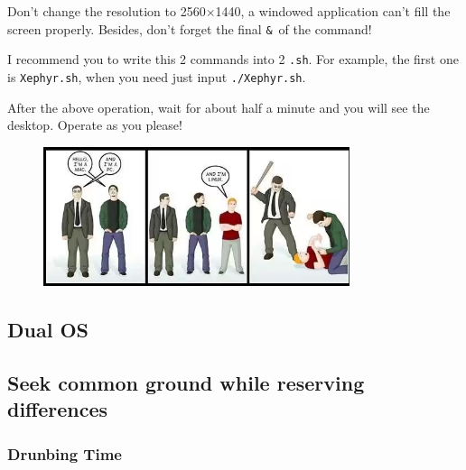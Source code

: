 \documentclass[12pt]{ctexart}
\newenvironment{mdquote}
{%
  \par\noindent
  \begin{list}{}{%
      \setlength{\leftmargin}{1em}%
      \setlength{\rightmargin}{0pt}%
      \setlength{\itemindent}{0pt}%
      \setlength{\listparindent}{\parindent}%
      \setlength{\topsep}{0.5\baselineskip}%
  }
  \item[\textbf{>}\ ]\itshape
}
{\end{list}\par}
\begin{document}
\begin{mdquote}
Don't change the resolution to 2560$\times$1440, a windowed
application can't fill the screen properly. Besides,
don't forget the final \texttt{\&}\ of the command!
\end{mdquote}

I recommend you to write this 2 commands into 2 \texttt{.sh}. For
example, the first one is \texttt{Xephyr.sh}, when you need just input
\texttt{./Xephyr.sh}.

After the above operation, wait for about half a minute and you will see
the desktop. Operate as you please!

\begin{figure}[H]
    \centering
    \includegraphics[width=0.8\textwidth,keepaspectratio]{assets/Linux/2.8 Return to Paradise/2.png}
\end{figure}

\newpage
\thispagestyle{empty}
\begin{center}
    \vspace*{96pt}
    \fontsize{60}{60}\par
    \fontsize{26}{31.2}\section{\textbf{Dual OS}}\par %
    \vspace{25pt}
    \fontsize{18}{21.6}\par %
    \vfill
\end{center}

\newpage
\subsection{\textbf{Seek common ground while reserving differences}}

\subsubsection{\textbf{Drunbing Time}}
\end{document}

